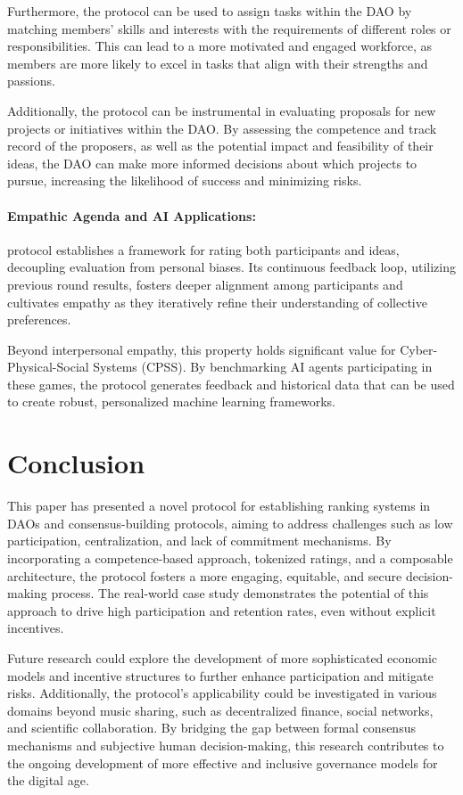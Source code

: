\documentclass{article}
\begin{document}
\begin{CJK}{UTF8}{gbsn}
\begin{multicols}{2}
        Furthermore, the protocol can be used to assign tasks within the DAO by matching members' skills and interests with the requirements of different roles or responsibilities. This can lead to a more motivated and engaged workforce, as members are more likely to excel in tasks that align with their strengths and passions.

        Additionally, the protocol can be instrumental in evaluating proposals for new projects or initiatives within the DAO. By assessing the competence and track record of the proposers, as well as the potential impact and feasibility of their ideas, the DAO can make more informed decisions about which projects to pursue, increasing the likelihood of success and minimizing risks.

        \paragraph*{Empathic Agenda and AI Applications:} protocol establishes a framework for rating both participants and ideas, decoupling evaluation from personal biases. Its continuous feedback loop, utilizing previous round results, fosters deeper alignment among participants and cultivates empathy as they iteratively refine their understanding of collective preferences.

        Beyond interpersonal empathy, this property holds significant value for Cyber-Physical-Social Systems (CPSS). By benchmarking AI agents participating in these games, the protocol generates feedback and historical data that can be used to create robust, personalized machine learning frameworks.

        \section{Conclusion}

        This paper has presented a novel protocol for establishing ranking systems in DAOs and consensus-building protocols, aiming to address challenges such as low participation, centralization, and lack of commitment mechanisms. By incorporating a competence-based approach, tokenized ratings, and a composable architecture, the protocol fosters a more engaging, equitable, and secure decision-making process. The real-world case study demonstrates the potential of this approach to drive high participation and retention rates, even without explicit incentives.

        Future research could explore the development of more sophisticated economic models and incentive structures to further enhance participation and mitigate risks. Additionally, the protocol's applicability could be investigated in various domains beyond music sharing, such as decentralized finance, social networks, and scientific collaboration. By bridging the gap between formal consensus mechanisms and subjective human decision-making, this research contributes to the ongoing development of more effective and inclusive governance models for the digital age.




\end{multicols}
\end{CJK}
\end{document}
